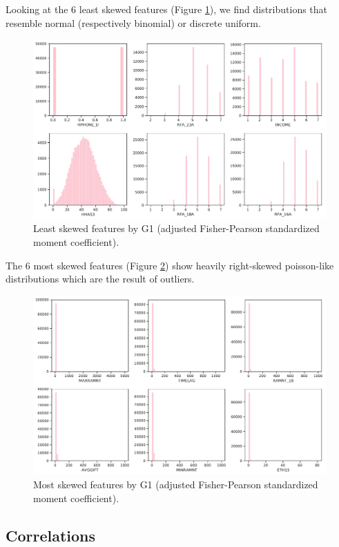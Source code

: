 \documentclass[
  11pt,
  a4paper,
  DIV=12,captions=tableheading,oneside,titlepage]{scrbook}
\begin{document}
Looking at the 6 least skewed features (Figure \ref{fig:least-skewed}), we find distributions that resemble normal (respectively binomial) or discrete uniform.

\begin{figure}

{\centering \includegraphics[width=0.7\linewidth]{figures/eda/least-skewed} 

}

\caption{Least skewed features by G1 (adjusted Fisher-Pearson standardized moment coefficient).}\label{fig:least-skewed}
\end{figure}

The 6 most skewed features (Figure \ref{fig:most-skewed}) show heavily right-skewed poisson-like distributions which are the result of outliers.

\begin{figure}

{\centering \includegraphics[width=0.7\linewidth]{figures/eda/most-skewed} 

}

\caption{Most skewed features by G1 (adjusted Fisher-Pearson standardized moment coefficient).}\label{fig:most-skewed}
\end{figure}

\hypertarget{correlations}{%
\subsection{Correlations}\label{correlations}}
\end{document}
